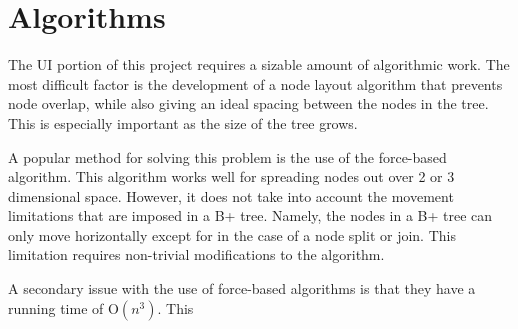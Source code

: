 \section{Algorithms}


The UI portion of this project requires a sizable amount of
algorithmic work. The most difficult factor is the development of a
node layout algorithm that prevents node overlap, while also giving an
ideal spacing between the nodes in the tree. This is especially
important as the size of the tree grows.

A popular method for solving this problem is the use of the
force-based algorithm. This algorithm works well for spreading nodes
out over 2 or 3 dimensional space. However, it does not take into
account the movement limitations that are imposed in a B+
tree. Namely, the nodes in a B+ tree can only move horizontally except
for in the case of a node split or join. This limitation requires
non-trivial modifications to the algorithm.

A secondary issue with the use of force-based algorithms is that they
have a running time of O$(n^3)$. This 


